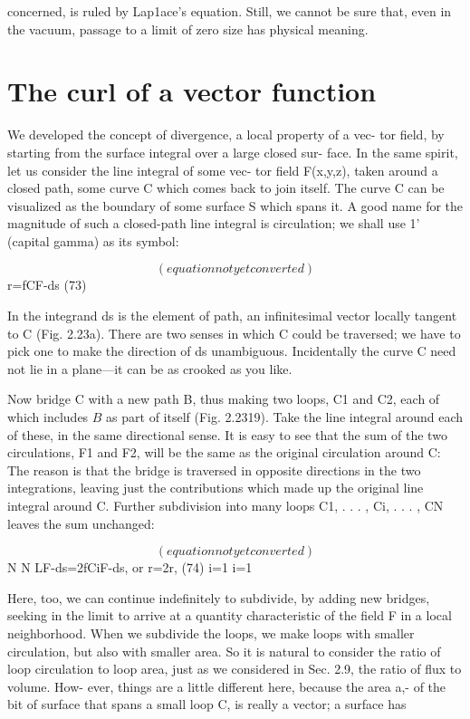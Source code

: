  

concerned, is ruled by Lap1ace's equation. Still, we cannot be sure
that, even in the vacuum, passage to a limit of zero size has physical
meaning.

\section{The curl of a vector function}

We developed the concept of divergence, a local property of a vec-
tor field, by starting from the surface integral over a large closed sur-
face. In the same spirit, let us consider the line integral of some vec-
tor field F(x,y,z), taken around a closed path, some curve C which
comes back to join itself. The curve C can be visualized as the
boundary of some surface S which spans it. A good name for the
magnitude of such a closed-path line integral is circulation; we shall
use 1' (capital gamma) as its symbol:

\begin{equation}
(equation not yet converted)
\end{equation}
r=fCF-ds (73)

In the integrand ds is the element of path, an infinitesimal vector
locally tangent to C (Fig. 2.23a). There are two senses in which C
could be traversed; we have to pick one to make the direction of ds
unambiguous. Incidentally the curve C need not lie in a plane---it
can be as crooked as you like.

Now bridge C with a new path B, thus making two loops, C1 and
C2, each of which includes $B$ as part of itself (Fig. 2.2319). Take the
line integral around each of these, in the same directional sense. It
is easy to see that the sum of the two circulations, F1 and F2, will be
the same as the original circulation around C: The reason is that the
bridge is traversed in opposite directions in the two integrations,
leaving just the contributions which made up the original line integral
around C. Further subdivision into many loops C1, . . . , Ci, . . . , CN
leaves the sum unchanged:

\begin{equation}
(equation not yet converted)
\end{equation}
N N
LF-ds=2fCiF-ds, or r=2r, (74)
i=1 i=1

Here, too, we can continue indefinitely to subdivide, by adding
new bridges, seeking in the limit to arrive at a quantity characteristic
of the field F in a local neighborhood. When we subdivide the loops,
we make loops with smaller circulation, but also with smaller area.
So it is natural to consider the ratio of loop circulation to loop area,
just as we considered in Sec. 2.9, the ratio of flux to volume. How-
ever, things are a little different here, because the area a,- of the bit
of surface that spans a small loop C, is really a vector; a surface has

